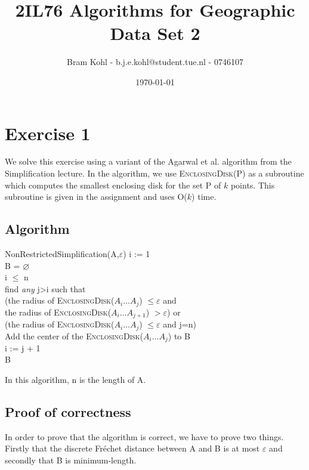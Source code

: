\documentclass[a4paper,11pt]{article}
\title{
	2IL76 Algorithms for Geographic Data Set 2 \\
}
\author{
	Bram Kohl - b.j.e.kohl@student.tue.nl - 0746107
}
\date{\today}
\begin{document}
	\maketitle
	
\section*{Exercise 1}
We solve this exercise using a variant of the Agarwal et al. algorithm from the Simplification lecture. In the algorithm, we use \textsc{EnclosingDisk(P)} as a subroutine which computes the smallest enclosing disk for the set P of $k$ points. This subroutine is given in the assignment and uses O($k$) time.\\
\subsection*{Algorithm}
\begin{algorithm}{NonRestrictedSimplification}{(A,$\varepsilon$)}
	i := 1\\
	B = $\varnothing$\\
	\qwhile i $\leq$ n \\
	find \textit{any} j>i such that \\
	\hspace{4ex} (the radius of \textsc{EnclosingDisk($A_i\dots A_j$)} $\leq \varepsilon$ and\\
	\hspace{4ex} the radius of \textsc{EnclosingDisk($A_i\dots A_{j+1}$)} $> \varepsilon$) or\\
	\hspace{4ex} (the radius of \textsc{EnclosingDisk($A_i\dots A_j$)} $\leq \varepsilon$ and j=n)\\
	Add the center of the \textsc{EnclosingDisk($A_i\dots A_j$)} to B\\
	i := j + 1 \qend \\
	\qreturn B
\end{algorithm} 
In this algorithm, n is the length of A.
\subsection*{Proof of correctness}
In order to prove that the algorithm is correct, we have to prove two things. Firstly that the discrete Fr\'{e}chet distance between A and B is at most $\varepsilon$ and secondly that B is minimum-length.\\
\end{document}
